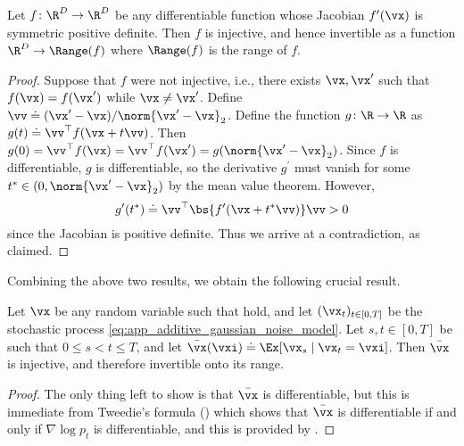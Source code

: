 \documentclass[../../book-main.tex]{subfiles}
\begin{document}
\begin{lemma}\label{lem:gribonval_A2}
    Let \(f \colon \R^{D} \to \R^{D}\) be any differentiable function whose Jacobian \(f^{\prime}(\vx)\) is symmetric positive definite. Then \(f\) is injective, and hence invertible as a function \(\R^{D} \to \Range(f)\) where \(\Range(f)\) is the range of \(f\).
\end{lemma}
\begin{proof}
    Suppose that \(f\) were not injective, i.e., there exists \(\vx, \vx^{\prime}\) such that \(f(\vx) = f(\vx^{\prime})\) while \(\vx \neq \vx^{\prime}\). Define \(\vv \doteq (\vx^{\prime} - \vx)/\norm{\vx^{\prime} - \vx}_{2}\). Define the function \(g \colon \R \to \R\) as \(g(t) \doteq \vv^{\top}f(\vx + t\vv)\). Then \(g(0) = \vv^{\top}f(\vx) = \vv^{\top}f(\vx^{\prime}) = g(\norm{\vx^{\prime} - \vx}_{2})\). Since \(f\) is differentiable, \(g\) is differentiable, so the derivative  \(g^{\prime}\) must vanish for some \(t^{\ast} \in (0, \norm{\vx^{\prime} - \vx}_{2})\) by the mean value theorem. However,
    \begin{equation}
        g^{\prime}(t^{\ast}) \doteq \vv^{\top}\bs{f^{\prime}(\vx + t^{\ast}\vv)}\vv > 0
    \end{equation}
    since the Jacobian is positive definite. Thus we arrive at a contradiction, as claimed.
\end{proof}

Combining the above two results, we obtain the following crucial result.

\begin{corollary}\label{cor:gribonval_A2}
    Let \(\vx\) be any random variable such that  hold, and let \((\vx_{t})_{t \in [0, T]}\) be the stochastic process \eqref{eq:app_additive_gaussian_noise_model}. Let \(s, t \in [0, T]\) be such that \(0 \leq s < t \leq T\), and let \(\bar{\vx}(\vxi) \doteq \Ex[\vx_{s} \mid \vx_{t} = \vxi]\). Then \(\bar{\vx}\) is injective, and therefore invertible onto its range.
\end{corollary}
\begin{proof}
    The only thing left to show is that \(\bar{\vx}\) is differentiable,  but this is immediate from Tweedie's formula () which shows that \(\bar{\vx}\) is differentiable if and only if \(\nabla \log p_{t}\) is differentiable, and this is provided by .
\end{proof}
\end{document}
